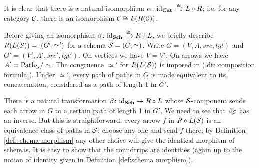 \documentclass[CT4S-EN-RU]{subfiles}
\begin{document}
\begin{proofENG}
It is clear that there is a natural isomorphism $\alpha\colon\textnormal{id}_{\mathbf{Cat}}\xrightarrow{\cong} L\circ R$; i.e. for any category $\mathcal{C}$, there is an isomorphism $\mathcal{C}\cong L(R(\mathcal{C}))$. 

Before giving an isomorphism $\beta\colon\textnormal{id}_{\mathbf{Sch}}\xrightarrow{\cong}R\circ L$, we briefly describe $R(L(\mathcal{S}))=:(G',\simeq')$ for a schema $\mathcal{S}=(G,\simeq)$. Write $G=(V,A,src,tgt)$ and $G'=(V',A',src',tgt')$. On vertices we have $V=V'$. On arrows we have $A'=\textnormal{Path}_G/\simeq$. The congruence $\simeq'$ for $R(L(\mathcal{S}))$ is imposed in (\ref{dia:composition formula}). Under $\simeq'$, every path of paths in $G$ is made equivalent to its concatenation, considered as a path of length 1 in $G'$. 

There is a natural transformation $\beta\colon\textnormal{id}_{\mathbf{Sch}}\rightarrow R\circ L$ whose $\mathcal{S}$-component sends each arrow in $G$ to a certain path of length 1 in $G'$. We need to see that $\beta_\mathcal{S}$ has an inverse. But this is straightforward: every arrow $f$ in $R\circ L(\mathcal{S})$ is an  equivalence class of paths in $\mathcal{S}$; choose any one and send $f$ there; by Definition \ref{def:schema morphism} any other choice will give the identical morphism of schemas. It is easy to show that the roundtrips are identities (again up to the notion of identity given in Definition \ref{def:schema morphism}).
\end{proofENG}

\begin{proofRUS}
\end{proofRUS}
\end{document}
